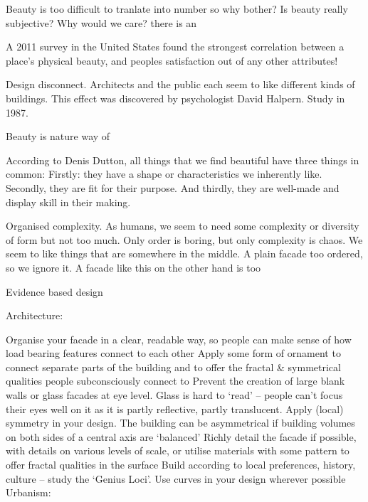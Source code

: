 Beauty is too difficult to tranlate into number so why bother?
Is beauty really subjective?
Why would we care? there is an

A 2011 survey in the United States found the strongest correlation between a place's physical beauty, and peoples satisfaction out of any other attributes!

Design disconnect. Architects and the public each seem to like different kinds of buildings. This effect was discovered by psychologist David Halpern. Study in 1987.

Beauty is nature way of

According to Denis Dutton, all things that we find beautiful have three things in common: Firstly: they have a shape or characteristics we inherently like. Secondly, they are fit for their purpose. And thirdly, they are well-made and display skill in their making.

Organised complexity. As humans, we seem to need some complexity or diversity of form but not too much. Only order is boring, but only complexity is chaos. We seem to like things that are somewhere in the middle. A plain facade too ordered, so we ignore it. A facade like this on the other hand is too

Evidence based design




Architecture:\cite{Aesthetic2022}

Organise your facade in a clear, readable way, so people can make sense of how load bearing features connect to each other
Apply some form of ornament to connect separate parts of the building and to offer the fractal & symmetrical qualities people subconsciously connect to
Prevent the creation of large blank walls or glass facades at eye level. Glass is hard to ‘read’ – people can’t focus their eyes well on it as it is partly reflective, partly translucent.
Apply (local) symmetry in your design. The building can be asymmetrical if building volumes on both sides of a central axis are ‘balanced’
Richly detail the facade if possible, with details on various levels of scale, or utilise materials with some pattern to offer fractal qualities in the surface
Build according to local preferences, history, culture – study the ‘Genius Loci’.
Use curves in your design wherever possible
Urbanism:

